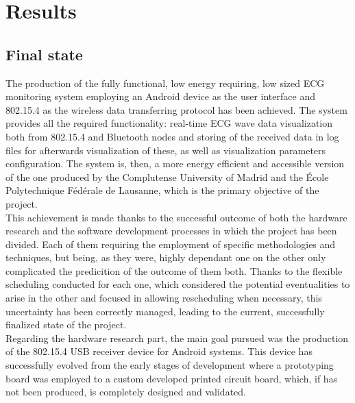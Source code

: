 \chapter{Results}
\label{cha:results}

	\section{Final state}
	\label{sec:end-state}
	


		The production of the fully functional, low energy requiring, low sized ECG monitoring system employing an Android device as the user interface and 802.15.4 as the wireless data transferring protocol has been achieved. The system provides all the required functionality: real-time ECG wave data visualization both from 802.15.4 and Bluetooth nodes and storing of the received data in log files for afterwards visualization of these, as well as visualization parameters configuration. The system is, then, a more energy efficient and accessible version of the one produced by the Complutense University of Madrid and the École Polytechnique Fédérale de Lausanne, which is the primary objective of the project.\\

		This achievement is made thanks to the successful outcome of both the hardware research and the software development processes in which the project has been divided. Each of them requiring the employment of specific methodologies and techniques, but being, as they were, highly dependant one on the other only complicated the predicition of the outcome of them both. Thanks to the flexible scheduling conducted for each one, which considered the potential eventualities to arise in the other and focused in allowing rescheduling when necessary, this uncertainty has been correctly managed, leading to the current, successfully finalized state of the project.\\
		
		Regarding the hardware research part, the main goal pursued was the production of the 802.15.4 USB receiver device for Android systems. This device has successfully evolved from the early stages of development where a prototyping board was employed to a custom developed printed circuit board, which, if has not been produced, is completely designed and validated.\\

